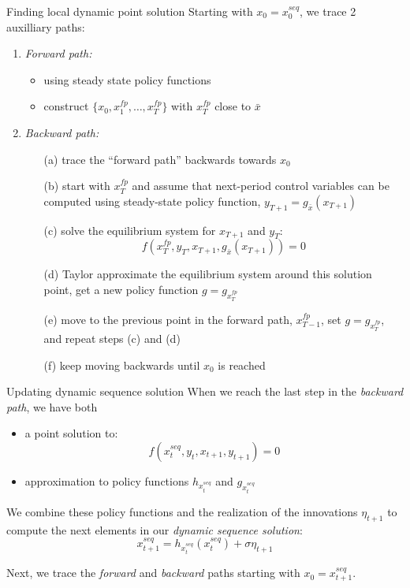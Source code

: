 \documentclass{beamer}
\begin{document}
\begin{frame}{Finding local dynamic point solution}
    Starting with $x_0=x^{seq}_0$, we trace 2 auxilliary paths:
    \begin{enumerate}
        \item \emph{Forward path:}
            \begin{itemize}
                \item using steady state policy functions
                \item construct $\{x_0,x^{fp}_1,\ldots,x^{fp}_T\}$ with 
                    $x^{fp}_T$ close to $\bar{x}$
            \end{itemize}
        \item \emph{Backward path:}
            \begin{itemize}
                \item[(a)] trace the ``forward path'' backwards towards $x_0$
                \item[(b)] start with $x^{fp}_T$ and assume that next-period
                    control variables can be computed using steady-state
                    policy function, $y_{T+1} = g_{\bar{x}}(x_{T+1})$
                \item[(c)] solve the equilibrium system for $x_{T+1}$ and $y_T$:
                    \[
                        f(x^{fp}_T, y_T, x_{T+1}, g_{\bar{x}}(x_{T+1})) = 0
                    \]
                \item[(d)] Taylor approximate the equilibrium system
                    around this solution point, get a new policy function
                    $g = g_{x^{fp}_T}$
                \item[(e)] move to the previous point in the forward path, $x^{fp}_{T-1}$, set $g = g_{x^{fp}_T}$, and repeat steps (c) and (d)
                \item[(f)] keep moving backwards until $x_0$ is reached
                        
            \end{itemize}
    \end{enumerate}
\end{frame}

\begin{frame}{Updating dynamic sequence solution}
    When we reach the last step in the \emph{backward path},
    we have both 
    \begin{itemize}
        \item a point solution to:
            \[
                f(x^{seq}_t,y_t,x_{t+1},y_{t+1}) = 0
            \]
        \item approximation to policy functions $h_{x^{seq}_t}$ and $g_{x^{seq}_t}$
    \end{itemize}

    \bigskip
    We combine these policy functions and the realization of the innovations $\eta_{t+1}$ to compute the next elements in our \emph{dynamic sequence solution}:
    \[
        x^{seq}_{t+1} = h_{x^{seq}_t}(x^{seq}_t) + \sigma \eta_{t+1}
    \]

    \bigskip
    Next, we trace the \emph{forward} and \emph{backward} paths starting 
    with $x_0 = x^{seq}_{t+1}$.
\end{frame}
\end{document}
